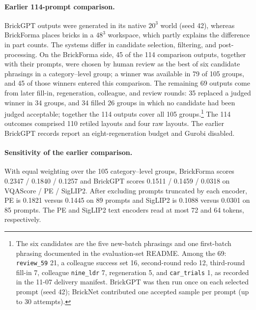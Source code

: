 \paragraph{Earlier 114-prompt comparison.} BrickGPT outputs were generated in its native $20^3$ world (seed 42), whereas BrickForma places bricks in a $48^3$ workspace, which partly explains the difference in part counts.
The systems differ in candidate selection, filtering, and post-processing.
On the BrickForma side, 45 of the 114 comparison outputs, together with their prompts, were chosen by human review as the best of six candidate phrasings in a category--level group; a winner was available in 79 of 105 groups, and 45 of those winners entered this comparison.
The remaining 69 outputs come from later fill-in, regeneration, colleague, and review rounds: 35 replaced a judged winner in 34 groups, and 34 filled 26 groups in which no candidate had been judged acceptable; together the 114 outputs cover all 105 groups.\footnote{The six candidates are the five new-batch phrasings and one first-batch phrasing documented in the evaluation-set README. Among the 69: \texttt{review\_59} 21, a colleague success set 16, second-round redo 12, third-round fill-in 7, colleague \texttt{nine\_ldr} 7, regeneration 5, and \texttt{car\_trials} 1, as recorded in the 11-07 delivery manifest. BrickGPT was then run once on each selected prompt (seed 42); BrickNet contributed one accepted sample per prompt (up to 30 attempts).}
The 114 outcomes comprised 110 retiled layouts and four raw layouts. The earlier BrickGPT records report an eight-regeneration budget and Gurobi disabled.

\paragraph{Sensitivity of the earlier comparison.}
With equal weighting over the 105 category--level groups, BrickForma scores 0.2347 / 0.1840 / 0.1257 and BrickGPT scores 0.1511 / 0.1459 / 0.0318 on VQAScore / PE / SigLIP2. After excluding prompts truncated by each encoder, PE is 0.1821 versus 0.1445 on 89 prompts and SigLIP2 is 0.1088 versus 0.0301 on 85 prompts. The PE and SigLIP2 text encoders read at most 72 and 64 tokens, respectively.

